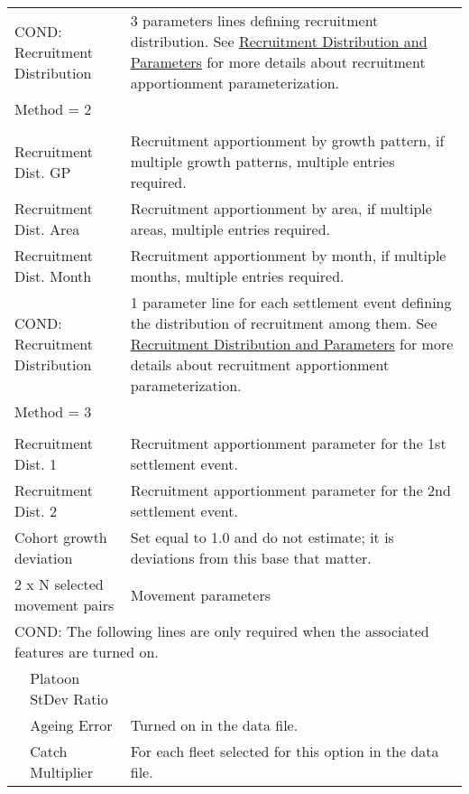 \begin{longtable}{p{1cm} p{2.25cm} p{10cm}}
	\multicolumn{2}{l}{COND: Recruitment Distribution} \Tstrut & 3 parameters lines defining recruitment distribution. See \hyperlink{recdist}{Recruitment Distribution and Parameters} for more details about recruitment apportionment parameterization. \\
	\multicolumn{2}{l}{Method = 2} \Tstrut & \\
	& & \\
	\multicolumn{2}{l}{Recruitment Dist. GP} \Tstrut & Recruitment apportionment by growth pattern, if multiple growth patterns, multiple entries required. \\
	\multicolumn{2}{l}{Recruitment Dist. Area} & Recruitment apportionment by area, if multiple areas, multiple entries required. \\
	\multicolumn{2}{l}{Recruitment Dist. Month} & Recruitment apportionment by month, if multiple months, multiple entries required. \Bstrut\\
	\hline

	\multicolumn{2}{l}{COND: Recruitment Distribution} \Tstrut & 1 parameter line for each settlement event defining the distribution of recruitment among them. See \hyperlink{recdist}{Recruitment Distribution and Parameters} for more details about recruitment apportionment parameterization. \\
	\multicolumn{2}{l}{Method = 3} \Tstrut & \\
	& & \\
	\multicolumn{2}{l}{Recruitment Dist. 1} \Tstrut & Recruitment apportionment parameter for the 1st settlement event. \\
	\multicolumn{2}{l}{Recruitment Dist. 2} & Recruitment apportionment parameter for the 2nd settlement event. \Bstrut\\
	\hline

	\multicolumn{2}{l}{Cohort growth deviation} \Tstrut & Set equal to 1.0 and do not estimate; it is deviations from this base that matter. \Bstrut\\
	\hline

	\multicolumn{2}{l}{2 x N selected movement pairs} & Movement parameters \Tstrut\Bstrut\\
	\hline

	\multicolumn{3}{l}{COND: The following lines are only required when the associated features are turned on.} \Tstrut\\
	& Platoon StDev Ratio & \\
	& Ageing Error & Turned on in the data file. \\
	& Catch Multiplier & For each fleet selected for this option in the data file. \\
	\hline


\end{longtable}
